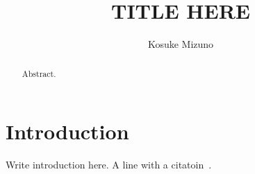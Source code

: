 \documentclass[aps,prl,preprint]{revtex4-2}
\begin{document}
\title{TITLE HERE}
\author{Kosuke Mizuno}

\begin{abstract}
Abstract.
\end{abstract}

\maketitle

\section{Introduction}

Write introduction here.
A line with a citatoin~\cite{einstein1905}.



\end{document}
